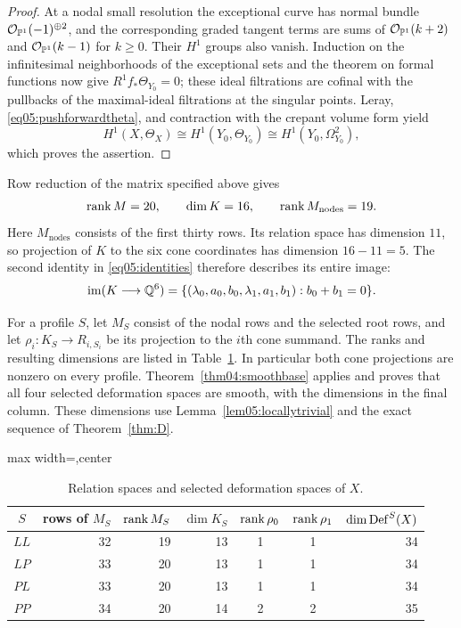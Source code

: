 \begin{proof}
At a nodal small resolution the exceptional curve has normal bundle
$\mathcal{O}_{\mathbb{P}^1}(-1)^{\oplus2}$, and the corresponding graded tangent
terms are sums of $\mathcal{O}_{\mathbb{P}^1}(k+2)$ and
$\mathcal{O}_{\mathbb{P}^1}(k-1)$ for $k\geq0$.  Their $H^1$ groups also vanish.
Induction on the infinitesimal neighborhoods of the exceptional sets
and the theorem on formal functions now give
$R^1f_*\Theta_{Y_0}=0$; these ideal filtrations are cofinal with the
pullbacks of the maximal-ideal filtrations at the singular points.
Leray, \eqref{eq05:pushforwardtheta}, and contraction with the crepant
volume form yield
\[
 H^1(X,\Theta_X)\cong H^1(Y_0,\Theta_{Y_0})
 \cong H^1(Y_0,\Omega^2_{Y_0}),
\]
which proves the assertion.
\end{proof}

Row reduction of the matrix specified above gives
\begin{equation}\label{eq05:fullranks}
 \operatorname{rank} M=20,\qquad \dim K=16,\qquad
 \operatorname{rank} M_{\mathrm{nodes}}=19.
\end{equation}
Here $M_{\mathrm{nodes}}$ consists of the first thirty rows.  Its relation
space has dimension $11$, so projection of $K$ to the six cone
coordinates has dimension $16-11=5$.  The second identity in
\eqref{eq05:identities} therefore describes its entire image:
\begin{equation}\label{eq05:coneimage}
 \operatorname{im}(K\longrightarrow\mathbb{Q}^6)
 =\{(\lambda_0,a_0,b_0,\lambda_1,a_1,b_1):b_0+b_1=0\}.
\end{equation}

For a profile $S$, let $M_S$ consist of the nodal rows and the selected
root rows, and let $\rho_i:K_S\to R_{i,S_i}$ be its projection to the
$i$th cone summand.  The ranks and resulting dimensions are listed in
Table~\ref{tab05:profiles}.
In particular both cone projections are nonzero on every profile.
Theorem~\ref{thm04:smoothbase} applies and proves that all four selected
deformation spaces are smooth, with the dimensions in the final column.
These dimensions use Lemma~\ref{lem05:locallytrivial} and the exact
sequence of Theorem~\ref{thm:D}.
\begin{table}[htbp]
\caption{Relation spaces and selected deformation spaces of $X$.}
\label{tab05:profiles}
\begin{adjustbox}{max width=\textwidth,center}
\begin{tabular}{c r r r c c r}
\toprule
$S$&rows of $M_S$&$\operatorname{rank} M_S$&$\dim K_S$&$\operatorname{rank}\rho_0$&$\operatorname{rank}\rho_1$
 &$\dim\operatorname{Def}^S(X)$\\
\midrule
$LL$&32&19&13&1&1&34\\
$LP$&33&20&13&1&1&34\\
$PL$&33&20&13&1&1&34\\
$PP$&34&20&14&2&2&35\\
\bottomrule
\end{tabular}
\end{adjustbox}
\end{table}

